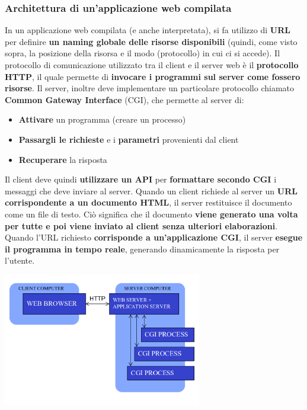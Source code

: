 \documentclass[12pt]{article}
\begin{document}
\subsubsection{Architettura di un'applicazione web compilata}
In un applicazione web compilata (e anche interpretata), si fa utilizzo di \textbf{URL} per definire \textbf{un naming globale delle risorse disponibili} (quindi, come visto sopra, la posizione della risorsa e il modo (protocollo) in cui ci si accede).
Il protocollo di comunicazione utilizzato tra il client e il server web è il \textbf{protocollo HTTP}, il quale permette di \textbf{invocare i programmi sul server come fossero risorse}.
Il server, inoltre deve implementare un particolare protocollo chiamato \textbf{Common Gateway Interface} (CGI), che permette al server di:
\begin{itemize}
    \item \textbf{Attivare} un programma (creare un processo)
    \item \textbf{Passargli le richieste} e i \textbf{parametri} provenienti dal client
    \item \textbf{Recuperare} la risposta
\end{itemize}
Il client deve quindi \textbf{utilizzare un API} per \textbf{formattare secondo CGI} i messaggi che deve inviare al server.
Quando un client richiede al server un \textbf{URL corrispondente a un documento HTML}, il server restituisce il documento come un file di testo. Ciò significa che il documento \textbf{viene generato una volta per tutte e poi viene inviato al client senza ulteriori elaborazioni}.
Quando l'URL richiesto \textbf{corrisponde a un'applicazione CGI}, il server \textbf{esegue il programma in tempo reale}, generando dinamicamente la risposta per l'utente.
\begin{center}
    \includegraphics[width = 0.65\textwidth]{Images/176.png}
\end{center}
\end{document}
